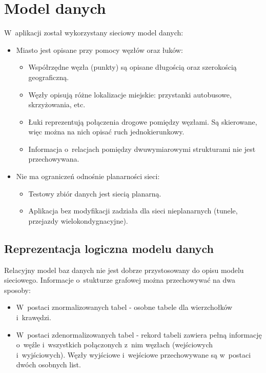 \documentclass[a4paper,12pt]{article}
\begin{document}
	\section*{Model danych}

	W~aplikacji został wykorzystany sieciowy model danych:

	\begin{itemize}
		\item Miasto jest opisane przy pomocy węzłów oraz łuków:
			\begin{itemize}
				\item Współrzędne węzła (punkty) są opisane długością oraz szerokością geograficzną.
				\item Węzły opisują różne lokalizacje miejskie: przystanki autobusowe, skrzyżowania, etc.
				\item Łuki reprezentują połączenia drogowe pomiędzy węzłami. Są skierowane, więc można na nich opisać ruch jednokierunkowy.
				\item Informacja o~relacjach pomiędzy dwuwymiarowymi strukturami nie jest przechowywana.
			\end{itemize}
		\item Nie ma ograniczeń odnośnie planarności sieci: 
			\begin{itemize}
				\item Testowy zbiór danych jest siecią planarną.
				\item Aplikacja bez modyfikacji zadziała dla sieci nieplanarnych (tunele, przejazdy wielokondygnacyjne).
			\end{itemize}
	\end{itemize}

	\subsection*{Reprezentacja logiczna modelu danych}

	Relacyjny model baz danych nie jest dobrze przystosowany do opisu modelu sieciowego. Informacje o~stukturze grafowej można przechowywać na dwa sposoby:

	\begin{itemize}
		\item W~postaci znormalizowanych tabel - osobne tabele dla wierzchołków i~krawędzi.
		\item W~postaci zdenormalizowanych tabel - rekord tabeli zawiera pełną informację o~węźle i~wszystkich połączonych z~nim węzłach (wejściowych i~wyjściowych). Węzły wyjściowe i~wejściowe przechowywane są w~postaci dwóch osobnych list.
	\end{itemize}
\end{document}
